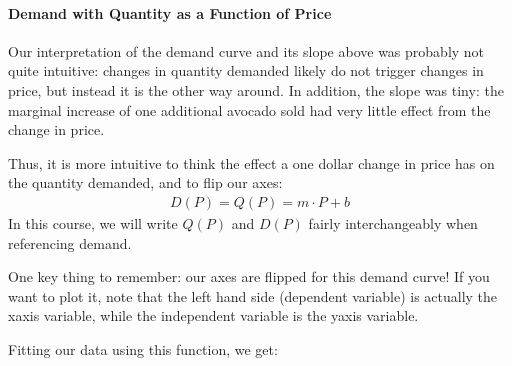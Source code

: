 \documentclass[letterpaper,10pt,english]{jupyterBook}
\begin{document}
\noindent{}


\paragraph{Demand with Quantity as a Function of Price}
\label{\detokenize{content/01-demand/02-example:demand-with-quantity-as-a-function-of-price}}
\sphinxAtStartPar
Our interpretation of the demand curve and its slope above was probably not quite intuitive: changes in quantity demanded likely do not trigger changes in price, but instead it is the other way around. In addition, the slope was tiny: the marginal increase of one additional avocado sold had very little effect from the change in price.

\sphinxAtStartPar
Thus, it is more intuitive to think the effect a one dollar change in price has on the quantity demanded, and to flip our axes:
\begin{equation*}
\begin{split}D(P) = Q(P) = m\cdot P + b\end{split}
\end{equation*}
\sphinxAtStartPar
In this course, we will write \(Q(P)\) and \(D(P)\) fairly interchangeably when referencing demand.

\sphinxAtStartPar
One key thing to remember: our axes are flipped for this demand curve! If you want to plot it, note that the left hand side (dependent variable) is actually the x\sphinxhyphen{}axis variable, while the independent variable is the y\sphinxhyphen{}axis variable.

\sphinxAtStartPar
Fitting our data using this function, we get:

\begin{sphinxVerbatim}[commandchars=\\\{\}]
     
 
 
\end{sphinxVerbatim}
\end{document}
